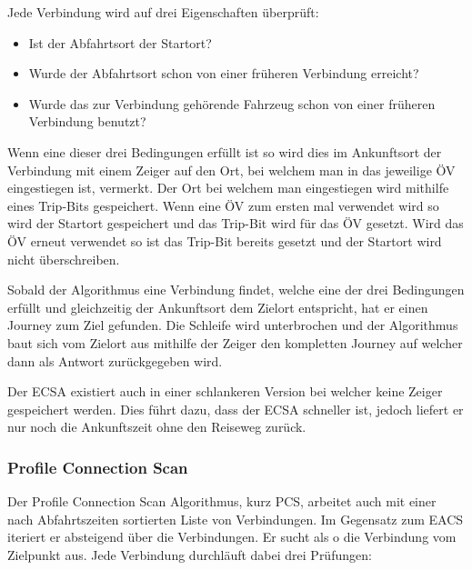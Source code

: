 Jede Verbindung wird auf drei Eigenschaften überprüft:
\begin{itemize}
	\item Ist der Abfahrtsort der Startort?
	\item Wurde der Abfahrtsort schon von einer früheren Verbindung erreicht?
	\item Wurde das zur Verbindung gehörende Fahrzeug schon von einer früheren Verbindung benutzt?
\end{itemize}
Wenn eine dieser drei Bedingungen erfüllt ist so wird dies im Ankunftsort der Verbindung mit einem Zeiger auf den Ort, bei welchem man in das jeweilige ÖV eingestiegen ist, vermerkt. Der Ort bei welchem man eingestiegen wird mithilfe eines Trip-Bits gespeichert. Wenn eine ÖV zum ersten mal verwendet wird so wird der Startort gespeichert und das Trip-Bit wird für das ÖV gesetzt. Wird das ÖV erneut verwendet so ist das Trip-Bit bereits gesetzt und der Startort wird nicht überschreiben. 

Sobald der Algorithmus eine Verbindung findet, welche eine der drei Bedingungen erfüllt und gleichzeitig der Ankunftsort dem Zielort entspricht, hat er einen Journey zum Ziel gefunden. Die Schleife wird unterbrochen und der Algorithmus baut sich vom Zielort aus mithilfe der Zeiger den kompletten Journey auf welcher dann als Antwort zurückgegeben wird.

Der ECSA existiert auch in einer schlankeren Version bei welcher keine Zeiger gespeichert werden. Dies führt dazu, dass der ECSA schneller ist, jedoch liefert er nur noch die Ankunftszeit ohne den Reiseweg zurück.

\subsubsection{Profile Connection Scan}
Der Profile Connection Scan Algorithmus, kurz PCS, arbeitet auch mit einer nach Abfahrtszeiten sortierten Liste von Verbindungen. Im Gegensatz zum EACS iteriert er absteigend über die Verbindungen. Er sucht als o die Verbindung vom Zielpunkt aus. Jede Verbindung durchläuft dabei drei Prüfungen:

